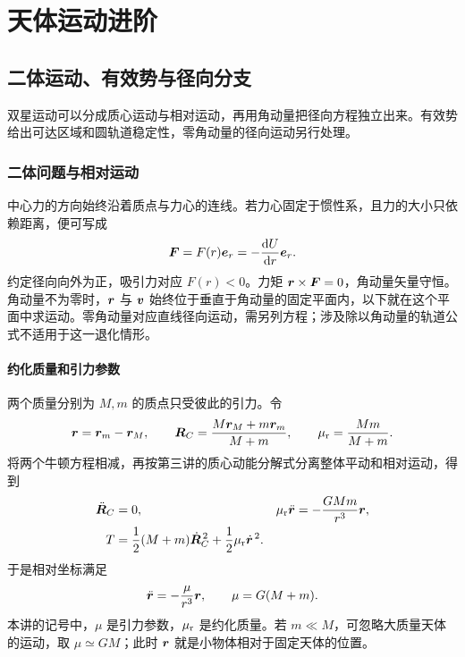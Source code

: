 \chapter{天体运动进阶}



\section{二体运动、有效势与径向分支}

双星运动可以分成质心运动与相对运动，再用角动量把径向方程独立出来。有效势给出可达区域和圆轨道稳定性，零角动量的径向运动另行处理。



\subsection{二体问题与相对运动}
中心力的方向始终沿着质点与力心的连线。若力心固定于惯性系，且力的大小只依赖距离，便可写成
\[
 \bm{F}=F(r)\bm{e}_r=-\frac{\mathop{}\!\mathrm d U}{\mathop{}\!\mathrm d r}\bm{e}_r.
\]
约定径向向外为正，吸引力对应 $F(r)<0$。力矩 $\bm{r}\times\bm{F}=0$，角动量矢量守恒。角动量不为零时，$\bm{r}$ 与 $\bm{v}$ 始终位于垂直于角动量的固定平面内，以下就在这个平面中求运动。零角动量对应直线径向运动，需另列方程；涉及除以角动量的轨道公式不适用于这一退化情形。

\subsubsection{约化质量和引力参数}

两个质量分别为 $M,m$ 的质点只受彼此的引力。令
\[
 \bm{r}=\bm{r}_m-\bm{r}_M,\qquad
 \bm{R}_C=\frac{M\bm{r}_M+m\bm{r}_m}{M+m},\qquad
 \mu_{\rm r}=\frac{Mm}{M+m}.
\]
将两个牛顿方程相减，再按第三讲的质心动能分解式分离整体平动和相对运动，得到
\begin{align}
 \ddot{\bm{R}}_C&=0, &
 \mu_{\rm r}\ddot{\bm{r}}&=-\frac{GMm}{r^3}\bm{r},\\
 T&=\frac12(M+m)\dot{\bm{R}}_C^{\,2}+\frac12\mu_{\rm r}\dot{\bm{r}}^{\,2}.
\end{align}
于是相对坐标满足
\begin{equation}\label{sup8:eq:d8-relative}
 \ddot{\bm{r}}=-\frac{\mu}{r^3}\bm{r},\qquad \mu=G(M+m).
\end{equation}
本讲的记号中，$\mu$ 是引力参数，$\mu_{\rm r}$ 是约化质量。若 $m\ll M$，可忽略大质量天体的运动，取 $\mu\simeq GM$；此时 $\bm{r}$ 就是小物体相对于固定天体的位置。

